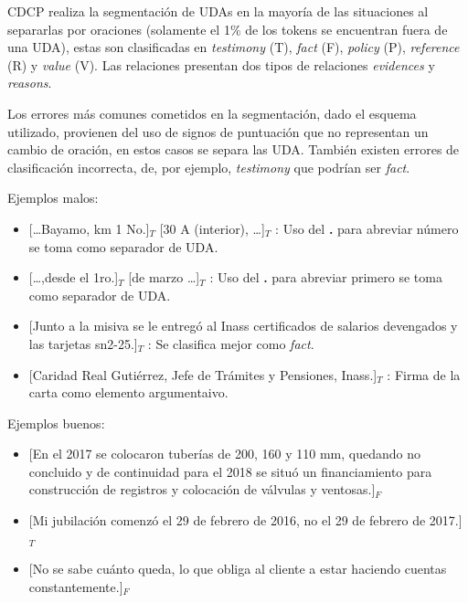 CDCP realiza la segmentación de UDAs en la mayoría de las situaciones al separarlas por oraciones 
(solamente el 1\% de los tokens se encuentran fuera de una UDA),
estas son clasificadas en \emph{testimony} (T), \emph{fact} (F), \emph{policy} (P), \emph{reference} (R)
y \emph{value} (V). Las relaciones presentan dos tipos de relaciones \emph{evidences} y \emph{reasons}.

Los errores más comunes cometidos en la segmentación, dado el esquema utilizado, provienen del uso 
de signos de puntuación que no representan un cambio de oración, en estos casos se separa las UDA. También
existen errores de clasificación incorrecta, de, por ejemplo, \emph{testimony} que podrían ser \emph{fact}.

Ejemplos malos:
\begin{itemize}
	\item \text{} [\dots Bayamo, km 1 No.]$_T$ [30 A (interior), \dots]$_T$ 
	: Uso del \textbf{.} para abreviar número se toma como separador de UDA. %
	\item \text{} [\dots ,desde el 1ro.]$_T$ [de marzo \dots]$_T$ 
	: Uso del \textbf{.} para abreviar primero se toma como separador de UDA. %
	\item \text{} [Junto a la misiva se le entregó al Inass certificados de salarios devengados y las tarjetas sn2-25.]$_T$ 
	: Se clasifica mejor como \emph{fact}. %
	\item \text{} [Caridad Real Gutiérrez, Jefe de Trámites y Pensiones, Inass.]$_T$ 
	: Firma de la carta como elemento argumentaivo. %
\end{itemize}

Ejemplos buenos:
\begin{itemize}
	\item \text{} [En el 2017 se colocaron tuberías de 200, 160 y 110 mm, quedando no concluido y de 
	continuidad para el 2018 se situó un financiamiento para construcción de registros y colocación de 
	válvulas y ventosas.]$_F$ %
	\item \text{} [Mi jubilación comenzó el 29 de febrero de 2016, no el 29 de febrero de 2017.]$_T$ %
	\item \text{} [No se sabe cuánto queda, lo que obliga al cliente a estar haciendo cuentas constantemente.]$_F$ %
\end{itemize}

